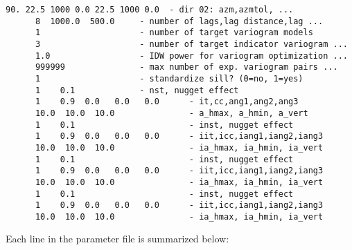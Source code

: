 \begin{framed}
\begin{lstlisting}[style=ccgParameterfile]
      90. 22.5 1000 0.0 22.5 1000 0.0  - dir 02: azm,azmtol, ...
      8  1000.0  500.0     - number of lags,lag distance,lag ...
      1                    - number of target variogram models
      3                    - number of target indicator variogram ...
      1.0                  - IDW power for variogram optimization ...
      999999               - max number of exp. variogram pairs ...
      1                    - standardize sill? (0=no, 1=yes)
      1    0.1             - nst, nugget effect
      1    0.9  0.0   0.0   0.0      - it,cc,ang1,ang2,ang3
      10.0  10.0  10.0               - a_hmax, a_hmin, a_vert
      1    0.1                       - inst, nugget effect
      1    0.9  0.0   0.0   0.0      - iit,icc,iang1,iang2,iang3
      10.0  10.0  10.0               - ia_hmax, ia_hmin, ia_vert
      1    0.1                       - inst, nugget effect
      1    0.9  0.0   0.0   0.0      - iit,icc,iang1,iang2,iang3
      10.0  10.0  10.0               - ia_hmax, ia_hmin, ia_vert
      1    0.1                       - inst, nugget effect
      1    0.9  0.0   0.0   0.0      - iit,icc,iang1,iang2,iang3
      10.0  10.0  10.0               - ia_hmax, ia_hmin, ia_vert
    \end{lstlisting}
\end{framed}

Each line in the parameter file is summarized below:

